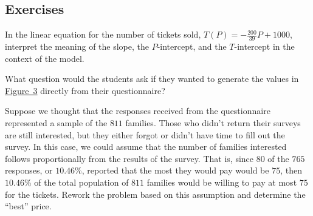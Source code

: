 \documentclass[10pt,]{book}
\theoremstyle{ptxdefinitionnotitle}
\theoremstyle{ptxdefinitiontitle}
\numberwithin{equation}{section}
\begin{document}
\subsection*{Exercises}\hypertarget{exercises-1}{}
\begin{divisionexercise}{1}\hypertarget{exercise-1}{}
\hypertarget{p-35}{}%
In the linear equation for the number of tickets sold, \(T \left(P \right) = - \frac{200}{39}P + 1000\), interpret the meaning of the slope, the \(P\)-intercept, and the \(T\)-intercept in the context of the model.%
\end{divisionexercise}%
\begin{divisionexercise}{2}\hypertarget{exercise-2}{}
\hypertarget{p-36}{}%
What question would the students ask if they wanted to generate the values in \hyperref[results-of-the-survey-summed]{Figure~3} directly from their questionnaire?%
\end{divisionexercise}%
\begin{divisionexercise}{3}\hypertarget{exercise-3}{}
\hypertarget{p-37}{}%
Suppose we thought that the responses received from the questionnaire represented a sample of the \(811\) families. Those who didn’t return their surveys are still interested, but they either forgot or didn’t have time to fill out the survey. In this case, we could assume that the number of families interested follows proportionally from the results of the survey. That is, since \(80\) of the \(765\) responses, or \(10.46\)\%, reported that the most they would pay would be \textdollar{}\(75\), then \(10.46\)\% of the total population of \(811\) families would be willing to pay at most \textdollar{}\(75\) for the tickets. Rework the problem based on this assumption and determine the “best” price.%
\end{divisionexercise}%
\typeout{************************************************}
\typeout{************************************************}
\end{document}
